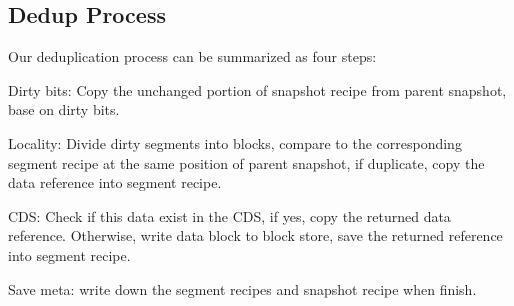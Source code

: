 \subsection{Dedup Process}
Our deduplication process can be summarized as four steps:
\begin{list}{Dedup}{}
\item {Dirty bits: Copy the unchanged portion of snapshot recipe from parent snapshot, base on dirty bits.}
\item {Locality: Divide dirty segments into blocks, compare to the corresponding segment recipe at the same position of parent snapshot, if duplicate, copy the data reference into segment recipe.}
\item {CDS: Check if this data exist in the CDS, if yes, copy the returned data reference. Otherwise, write data block to block store, save the returned reference into segment recipe.}
\item {Save meta: write down the segment recipes and snapshot recipe when finish.}
\end{list}
